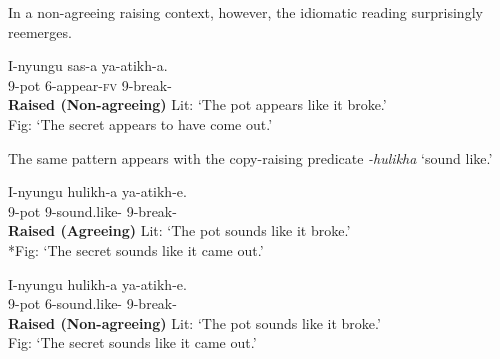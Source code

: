\documentclass[output=paper,colorlinks,citecolor=brown
]{langscibook}
\begin{document}
\noindent In a non-agreeing raising context, however, the idiomatic reading surprisingly reemerges. 

\ea \label{ex:johnson:NonAgrCRIdiom}
\gll I-nyungu sas-a ya-atikh-a. \\
9-pot 6\Sm-appear-\textsc{fv} 9\Sm-break-\Fv{}\\\hfill\textbf{Raised (Non-agreeing)}
\glt Lit: `The pot appears like it broke.' \\
Fig: `The secret appears to have come out.'
\z 

\noindent The same pattern appears with the copy-raising predicate \textit{-hulikha} `sound like.' 

\ea \label{ex:johnson:PotSoundsLikeBroke}
\begin{xlist}

\ex \label{ex:johnson:PotSoundsLikeBrokeAgreeing}
\gll I-nyungu hulikh-a ya-atikh-e.\\
9-pot 9\Sm-sound.like-\Fv{} 9\Sm-break-\Pst{}\\\hfill\textbf{Raised (Agreeing)}
\glt Lit: `The pot sounds like it broke.'\\
*Fig: `The secret sounds like it came out.’

\ex\label{ex:johnson:NonAgrCRPotSoundsLikeItBroke}
\gll I-nyungu hulikh-a ya-atikh-e.\\
9-pot 6\Sm-sound.like-\Fv{} 9\Sm-break-\Pst{}\\\hfill\textbf{Raised (Non-agreeing)}
\glt Lit: `The pot sounds like it broke.’\\
Fig: `The secret sounds like it came out.’\\

\end{xlist}
\z 
\end{document}
